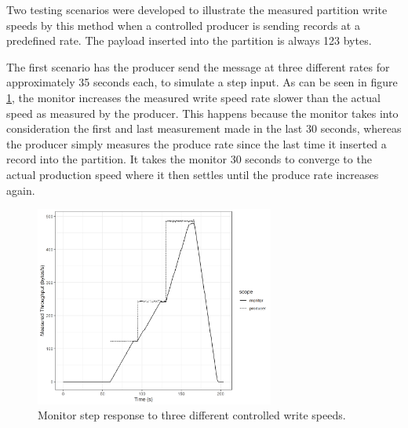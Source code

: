 Two testing scenarios were developed to illustrate the measured partition write
speeds by this method when a controlled producer is sending records at a
predefined rate. The payload inserted into the partition is always 123 bytes.

The first scenario has the producer send the message at three different rates for
approximately 35 seconds each, to simulate a step input. As can be seen in
figure \ref{fig:monitor_step}, the monitor increases the measured write speed
rate slower than the actual speed as measured by the producer. This happens
because the monitor takes into consideration the first and last measurement made
in the last 30 seconds, whereas the producer simply measures the produce rate
since the last time it inserted a record into the partition. It takes the
monitor 30 seconds to converge to the actual production speed where it then
settles until the produce rate increases again.

\begin{figure}[htb!] 
    \centering
    \includegraphics[width=0.7\textwidth]{images/monitor/step.png}
    \caption{Monitor step response to three different controlled write speeds.}
    \label{fig:monitor_step} 
\end{figure}

